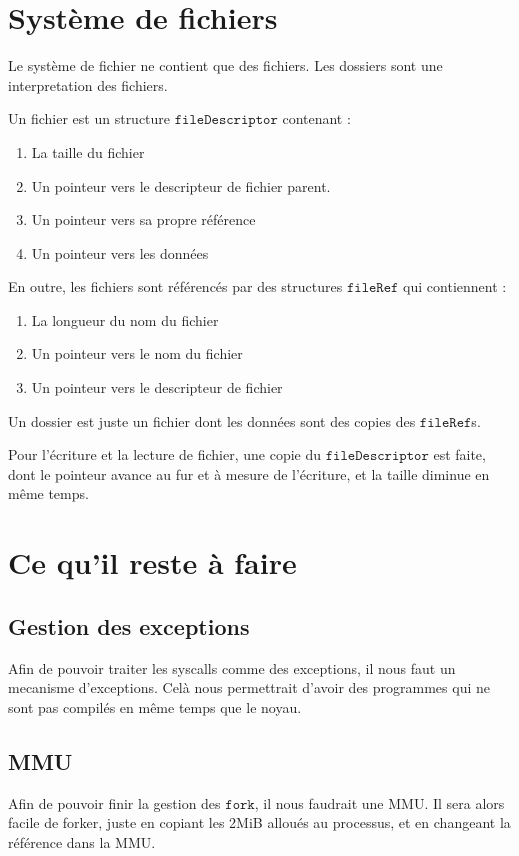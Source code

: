 \documentclass[a4paper,11pt]{article}
\begin{document}
\section{Système de fichiers}
Le système de fichier ne contient que des fichiers. Les dossiers sont une 
interpretation des fichiers. 

Un fichier est un structure $\mathtt{fileDescriptor}$ contenant :
\begin{enumerate}
	\item La taille du fichier
	\item Un pointeur vers le descripteur de fichier parent.
	\item Un pointeur vers sa propre référence
	\item Un pointeur vers les données
\end{enumerate}

En outre, les fichiers sont référencés par des structures $\mathtt{fileRef}$ qui
contiennent : 
\begin{enumerate}
	\item La longueur du nom du fichier
	\item Un pointeur vers le nom du fichier
	\item Un pointeur vers le descripteur de fichier
\end{enumerate}

Un dossier est juste un fichier dont les données sont des copies des 
$\mathtt{fileRef}$s.

Pour l'écriture et la lecture de fichier, une copie du $\mathtt{fileDescriptor}$
est faite, dont le pointeur avance au fur et à mesure de l'écriture, et la 
taille diminue en même temps.

\section{Ce qu'il reste à faire}
\subsection{Gestion des exceptions}
Afin de pouvoir traiter les syscalls comme des exceptions, il nous faut un 
mecanisme d'exceptions. Celà nous permettrait d'avoir des programmes qui ne sont
pas compilés en même temps que le noyau.

\subsection{MMU}
Afin de pouvoir finir la gestion des $\mathtt{fork}$, il nous faudrait une MMU. 
Il sera alors facile de forker, juste en copiant les 2MiB alloués au processus, 
et en changeant la référence dans la MMU.
\end{document}
